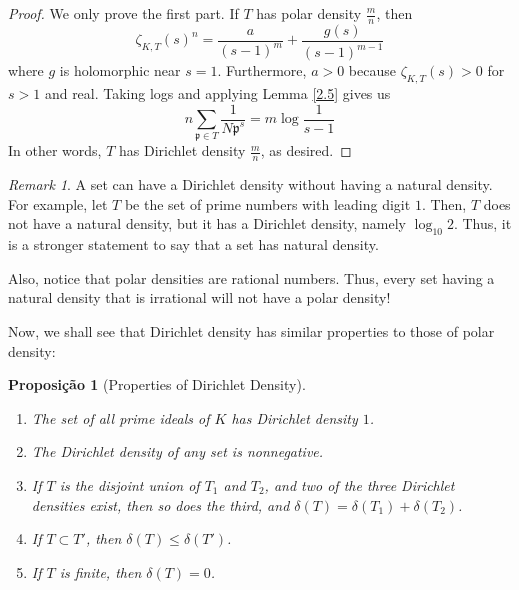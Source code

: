 \documentclass{article}
\theoremstyle{plain}
\newtheorem{prop}[thm]{Proposição}
\theoremstyle{definition}
\theoremstyle{remark}
\newtheorem{rem}[thm]{Remark}
\numberwithin{equation}{section}
\numberwithin{thm}{section}
\begin{document}
\begin{proof}
We only prove the first part. If $T$ has polar density $\frac{m}{n}$, then $$\zeta_{K, T}(s)^{n} = \frac{a}{(s-1)^{m}} + \frac{g(s)}{(s-1)^{m-1}}$$ where $g$ is holomorphic near $s = 1$. Furthermore, $a > 0$ because $\zeta_{K, T}(s) > 0$ for $s > 1$ and real. Taking logs and applying Lemma \ref{2.5} gives us $$n \sum_{\mathfrak{p} \in T} \frac{1}{N\mathfrak{p}^{s}} = m \log\frac{1}{s - 1}$$ In other words, $T$ has Dirichlet density $\frac{m}{n}$, as desired. 
\end{proof}

\begin{rem}
A set can have a Dirichlet density without having a natural density. For example, let $T$ be the set of prime numbers with leading digit $1$. Then, $T$ does not have a natural density, but it has a Dirichlet density, namely $\log_{10} 2$. Thus, it is a stronger statement to say that a set has natural density. 

Also, notice that polar densities are rational numbers. Thus, every set having a natural density that is irrational will not have a polar density!
\end{rem}

Now, we shall see that Dirichlet density has similar properties to those of polar density: 

\begin{prop}[Properties of Dirichlet Density] 

$ $ \\ \vspace{-0.5cm}



\begin{enumerate}

\item The set of all prime ideals of $K$ has Dirichlet density $1$. 

\item The Dirichlet density of any set is nonnegative.

\item If $T$ is the disjoint union of $T_1$ and $T_2$, and two of the three Dirichlet densities exist, then so does the third, and $\delta(T) = \delta(T_1) + \delta(T_2)$. 

\item If $T \subset T'$, then $\delta(T) \leq \delta(T')$. 

\item If $T$ is finite, then $\delta(T) = 0$.

\end{enumerate}

\end{prop}
\end{document}
